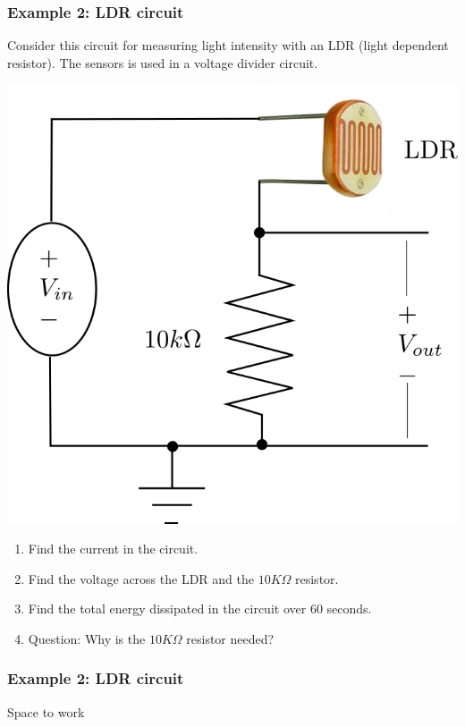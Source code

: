 \documentclass[fleqn]{beamer} %
\newcommand{\sectionIIIsubsectionIVtitle}{Example 2: LDR circuit}
\begin{document}
			\begin{frame}
				\frametitle{\sectionIIIsubsectionIVtitle}

				\small

				Consider this circuit for measuring light intensity with an LDR (light dependent resistor). The sensors is used in a voltage divider circuit. 

				\begin{multicols}{2}
					\includegraphics[scale=.20]{images/ldr_circuit.png}

					\begin{enumerate}

						\item Find the current in the circuit.
						\item Find the voltage across the LDR and the $10K\Omega$ resistor.
						\item Find the total energy dissipated in the circuit over 60 seconds.\vspc

						\item Question: Why is the $10K\Omega$ resistor needed? 

					\end{enumerate}
				\end{multicols}

			\end{frame}

			\begin{frame}
				\frametitle{\sectionIIIsubsectionIVtitle}
				Space to work


			\end{frame}
\end{document}
